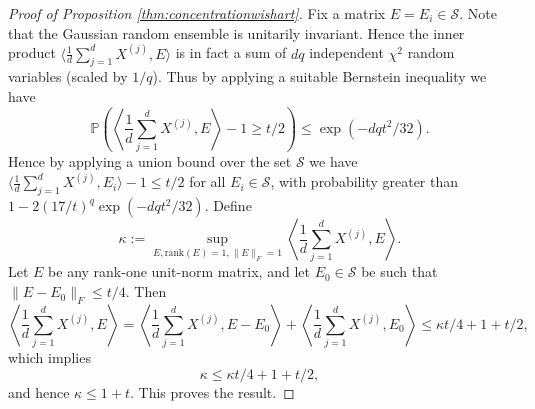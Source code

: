 \documentclass[11pt,letterpaper]{article}
\newcommand{\be}{\mathbf{e}}
\begin{document}
\begin{proof}[Proof of Proposition \ref{thm:concentrationwishart}]
	Fix a matrix $E = E_i \in \mathcal{S}$.  Note that the Gaussian random ensemble is unitarily invariant.  Hence the inner product $\langle \frac{1}{d}\sum_{j=1}^{d}  X^{(j)}, E \rangle$ is in fact a sum of $dq$ independent $\chi^2$ random variables (scaled by $1/q$).  Thus by applying a suitable Bernstein inequality we have
	\begin{equation*}
		\mathbb{P} \left( \left\langle \frac{1}{d}\sum_{j=1}^{d}  X^{(j)}, E \right\rangle  - 1 \geq t/2 \right) \leq \exp(-dqt^2/32).
	\end{equation*}
	Hence by applying a union bound over the set $\mathcal{S}$ we have $ \langle \frac{1}{d}\sum_{j=1}^{d}  X^{(j)} , E_i \rangle - 1  \leq t/2$ for all $E_i \in \mathcal{S}$, with probability greater than $1- 2 (17/t)^{q} \exp(-dqt^2/32)$.  Define
	\begin{equation*}
		\kappa := \sup_{E, \mathrm{rank}(E)=1, \|E\|_F=1} \left\langle \frac{1}{d}\sum_{j=1}^{d}  X^{(j)} , E \right\rangle.
	\end{equation*}
	Let $E$ be any rank-one unit-norm matrix, and let $E_0 \in \mathcal{S}$ be such that $\|E - E_0 \|_F \leq t/4$.  Then
	\begin{equation*}
		\left\langle \frac{1}{d}\sum_{j=1}^{d} X^{(j)}, E \right\rangle = \left\langle \frac{1}{d}\sum_{j=1}^{d} X^{(j)}, E - E_0 \right\rangle + \left\langle \frac{1}{d}\sum_{j=1}^{d} X^{(j)}, E_0 \right\rangle \leq \kappa t/4 + 1 + t/2,
	\end{equation*}
	which implies
	\begin{equation*}
		\kappa \leq \kappa t/4 + 1 + t/2,
	\end{equation*}
	and hence $\kappa \leq 1 + t$.  This proves the result.

\end{proof}
\end{document}
